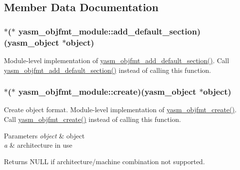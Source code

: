 \subsection{Member Data Documentation}
\hypertarget{structyasm__objfmt__module_a0beb3df2ad8e10f879baa0e624235adf}{
\subsubsection[{add\-\_\-default\-\_\-section}]{$\ast$($\ast$ yasm\-\_\-objfmt\-\_\-module\-::add\-\_\-default\-\_\-section)({\bf yasm\-\_\-object} $\ast$object)}}\label{structyasm__objfmt__module_a0beb3df2ad8e10f879baa0e624235adf}
Module-\/level implementation of \hyperlink{objfmt_8h_a1c6ab10c63842beab6506bb6e4df1076}{yasm\-\_\-objfmt\-\_\-add\-\_\-default\-\_\-section()}. Call \hyperlink{objfmt_8h_a1c6ab10c63842beab6506bb6e4df1076}{yasm\-\_\-objfmt\-\_\-add\-\_\-default\-\_\-section()} instead of calling this function. \hypertarget{structyasm__objfmt__module_ab31b562cdf3e48eb10cf2ba407546ff3}{
\subsubsection[{create}]{$\ast$($\ast$ yasm\-\_\-objfmt\-\_\-module\-::create)({\bf yasm\-\_\-object} $\ast$object)}}\label{structyasm__objfmt__module_ab31b562cdf3e48eb10cf2ba407546ff3}
Create object format. Module-\/level implementation of \hyperlink{objfmt_8h_af9c1f77d55eeb297af691bc7934b08a2}{yasm\-\_\-objfmt\-\_\-create()}. Call \hyperlink{objfmt_8h_af9c1f77d55eeb297af691bc7934b08a2}{yasm\-\_\-objfmt\-\_\-create()} instead of calling this function. 
\begin{DoxyParams}{Parameters}
{\em object} & object \\
\hline
{\em a} & architecture in use \\
\hline
\end{DoxyParams}
\begin{DoxyReturn}{Returns}
N\-U\-L\-L if architecture/machine combination not supported. 
\end{DoxyReturn}
